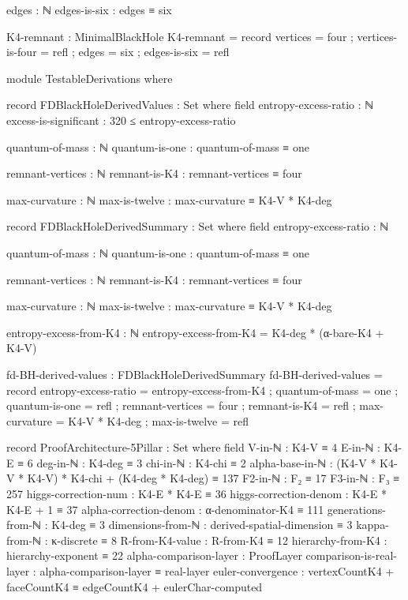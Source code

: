 \documentclass[11pt,a4paper]{book}
\begin{document}
\begin{code}
      edges : ℕ
      edges-is-six : edges ≡ six
      
  K4-remnant : MinimalBlackHole
  K4-remnant = record
    { vertices = four
    ; vertices-is-four = refl
    ; edges = six
    ; edges-is-six = refl
    }
    
module TestableDerivations where

  record FDBlackHoleDerivedValues : Set where
    field
      entropy-excess-ratio : ℕ
      excess-is-significant : 320 ≤ entropy-excess-ratio
      
      quantum-of-mass : ℕ
      quantum-is-one : quantum-of-mass ≡ one
      
      remnant-vertices : ℕ
      remnant-is-K4 : remnant-vertices ≡ four
      
      max-curvature : ℕ
      max-is-twelve : max-curvature ≡ K4-V * K4-deg
      
  record FDBlackHoleDerivedSummary : Set where
    field
      entropy-excess-ratio : ℕ
      
      quantum-of-mass : ℕ
      quantum-is-one : quantum-of-mass ≡ one
      
      remnant-vertices : ℕ
      remnant-is-K4 : remnant-vertices ≡ four
      
      max-curvature : ℕ
      max-is-twelve : max-curvature ≡ K4-V * K4-deg
      

  entropy-excess-from-K4 : ℕ
  entropy-excess-from-K4 = K4-deg * (α-bare-K4 + K4-V)

  fd-BH-derived-values : FDBlackHoleDerivedSummary
  fd-BH-derived-values = record
    { entropy-excess-ratio = entropy-excess-from-K4
    ; quantum-of-mass = one
    ; quantum-is-one = refl
    ; remnant-vertices = four
    ; remnant-is-K4 = refl
    ; max-curvature = K4-V * K4-deg
    ; max-is-twelve = refl
    }

record ProofArchitecture-5Pillar : Set where
  field
    V-in-ℕ   : K4-V ≡ 4
    E-in-ℕ   : K4-E ≡ 6
    deg-in-ℕ : K4-deg ≡ 3
    chi-in-ℕ : K4-chi ≡ 2
    alpha-base-in-ℕ : (K4-V * K4-V * K4-V) * K4-chi + (K4-deg * K4-deg) ≡ 137
    F2-in-ℕ  : F₂ ≡ 17
    F3-in-ℕ  : F₃ ≡ 257
    higgs-correction-num   : K4-E * K4-E ≡ 36
    higgs-correction-denom : K4-E * K4-E + 1 ≡ 37
    alpha-correction-denom : α-denominator-K4 ≡ 111
    generations-from-ℕ     : K4-deg ≡ 3
    dimensions-from-ℕ      : derived-spatial-dimension ≡ 3
    kappa-from-ℕ           : κ-discrete ≡ 8
    R-from-K4-value        : R-from-K4 ≡ 12
    hierarchy-from-K4      : hierarchy-exponent ≡ 22
    alpha-comparison-layer   : ProofLayer
    comparison-is-real-layer : alpha-comparison-layer ≡ real-layer
    euler-convergence : vertexCountK4 + faceCountK4 ≡ edgeCountK4 + eulerChar-computed


\end{code}
\end{document}
